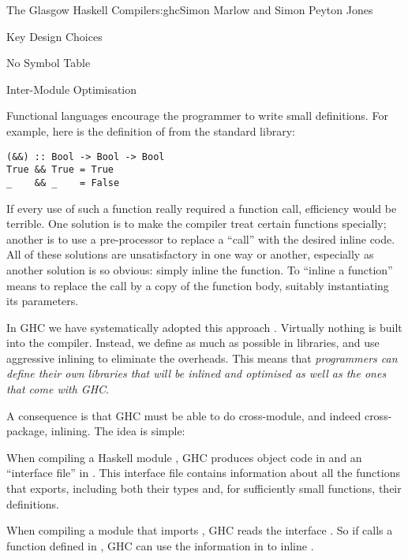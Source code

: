 \begin{aosachapter}{The Glasgow Haskell Compiler}{s:ghc}{Simon Marlow and Simon Peyton Jones}
\begin{aosasect1}{Key Design Choices}
\begin{aosasect2}{No Symbol Table}
\end{aosasect2}

\begin{aosasect2}{Inter-Module Optimisation}

Functional languages encourage the programmer to write small
definitions.  For example, here is the definition of \code{\&\&} from
the standard library:

\begin{verbatim}
(&&) :: Bool -> Bool -> Bool
True && True = True
_    && _    = False
\end{verbatim}

If every use of such a function really required a function call,
efficiency would be terrible.  One solution is to make the compiler
treat certain functions specially; another is to use a pre-processor
to replace a ``call'' with the desired inline code.  All of these
solutions are unsatisfactory in one way or another, especially as
another solution is so obvious: simply inline the function.  To
``inline a function'' means to replace the call by a copy of the
function body, suitably instantiating its parameters.

In GHC we have systematically adopted this approach \cite{bib:inlining}.
Virtually nothing is built into the compiler.  Instead, we define as
much as possible in libraries, and use aggressive inlining to eliminate
the overheads.  This means that \emph{programmers can define their own
  libraries that will be inlined and optimised as well as the ones that
  come with GHC}.

A consequence is that GHC must be able to do cross-module, and indeed
cross-package, inlining.  The idea is simple:

\begin{aosaitemize}

\item When compiling a Haskell module , GHC produces
  object code in  and an ``interface file'' in
  .  This interface file contains information about all
  the functions that  exports, including both their types
  and, for sufficiently small functions, their definitions.

\item When compiling a module  that imports
  , GHC reads the interface .  So if
   calls a function  defined in ,
  GHC can use the information in  to inline .


\end{aosaitemize}
\end{aosasect2}
\end{aosasect1}
\end{aosachapter}

